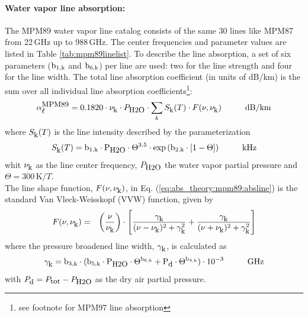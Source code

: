 \paragraph{Water vapor line absorption:}
\label{levele:mpm89_h2olines}
The MPM89 water vapor line catalog consists of the same 30 lines 
like MPM87 from 22\,GHz up to 988\,GHz. The center frequencies and parameter 
values are listed in Table \ref{tab:mpm89linelist}. To describe the line 
absorption, a set of six parameters ($\rm b_{\rm 1,k}$ and $\rm b_{\rm 6,k}$) per line are used: two 
for the line strength and four for the line width. The total line 
absorption coefficient (in units of dB/km) is the sum over all
individual line absorption coefficients\footnote{see footnote for
  MPM97 line absorption}:
\begin{equation}
  \label{eq:abs_theory:mpm89:absline}
  \alphampmml = 0.1820 \cdot \nuk \cdot \phzo \cdot 
  \sum_{k}{\inten \cdot \shape}\hspace*{10mm}\mbox{dB/km}
\end{equation}
where $S_{\mbox{\rm \small k}}(T)$ is the line intensity described by the parameterization
\begin{equation}
  \label{eq:abs_theory:mpm89:strength}
  \inten = \bek \cdot \phzo \cdot \Theta^{3.5} 
           \cdot \exp{(\bzk \cdot [1-\Theta])}\hspace*{10mm}\mbox{kHz}
\end{equation}
whit $\nu_{\mbox{\rm \small k}}$ as the line center frequency, $P_{\mbox{\rm \small H2O}}$ the water
vapor partial pressure and $\Theta = 300\,\mbox{K}/T$.\\
The line shape function, $F(\nu,\nu_{\mbox{\rm \small k}})$, in Eq. (\ref{eq:abs_theory:mpm89:absline}) 
is the standard Van Vleck-Weisskopf (VVW) function, given by 
\begin{eqnarray}
  \label{eq:abs_theory:mpm89:VVW}
  F(\nu,\nu_{\mbox{\rm \small k}}) & = & \left(\frac{\nu}{\nu_{\mbox{\rm \small k}}}\right) \cdot 
               \left[\frac{\gamma_{\mbox{\rm \small k}}}{(\nu - \nu_{\mbox{\rm \small k}})^2 + \gamma_{\mbox{\rm \small k}}^2} + 
                     \frac{\gamma_{\mbox{\rm \small k}}}{(\nu + \nu_{\mbox{\rm \small k}})^2 + \gamma_{\mbox{\rm \small k}}^2}\right]
\end{eqnarray}
where the pressure broadened line width, $\gamma_{\mbox{\rm \small k}}$, is calculated as
\begin{equation}
  \label{eq:abs_theory:mpm89:gamma}
  \gamk = \bdk \cdot 
         (\bfk \cdot \phzo \cdot \Theta^{\bsk} + 
                     \pda  \cdot \Theta^{\bvk})
        \cdot 10^{-3}\hspace*{10mm}\mbox{GHz}
\end{equation}
with $P_{\mbox{\rm \small d}}=P_{\mbox{\rm \small tot}}-P_{\mbox{\rm \small H2O}}$ as the dry air partial pressure. 
